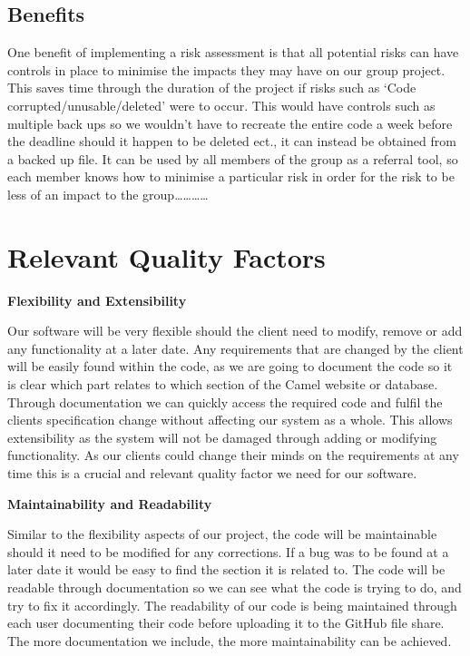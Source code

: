 \documentclass[12pt]{article}
\begin{document}
\subsection{Benefits}

One benefit of implementing a risk assessment is that all potential risks can have controls in place to minimise the impacts they may have on our group project. This saves time through the duration of the project if risks such as ‘Code corrupted/unusable/deleted’ were to occur. This would have controls such as multiple back ups so we wouldn’t have to recreate the entire code a week before the deadline should it happen to be deleted ect., it can instead be obtained from a backed up file.  It can be used by all members of the group as a referral tool, so each member knows how to minimise a particular risk in order for the risk to be less of an impact to the group………… 

\newpage
    
	\section{Relevant Quality Factors}
	\textbf{Flexibility and Extensibility}  

Our software will be very flexible should the client need to modify, remove or add any functionality at a later date. Any requirements that are changed by the client will be easily found within the code, as we are going to document the code so it is clear which part relates to which section of the Camel website or database. Through documentation we can quickly access the required code and fulfil the clients specification change without affecting our system as a whole. This allows extensibility as the system will not be damaged through adding or modifying functionality. As our clients could change their minds on the requirements at any time this is a crucial and relevant quality factor we need for our software. 

    \textbf{Maintainability and Readability}   
    
Similar to the flexibility aspects of our project, the code will be maintainable should it need to be modified for any corrections. If a bug was to be found at a later date it would be easy to find the section it is related to. The code will be readable through documentation so we can see what the code is trying to do, and try to fix it accordingly. The readability of our code is being maintained through each user documenting their code before uploading it to the GitHub file share. The more documentation we include, the more maintainability can be achieved.
\end{document}

